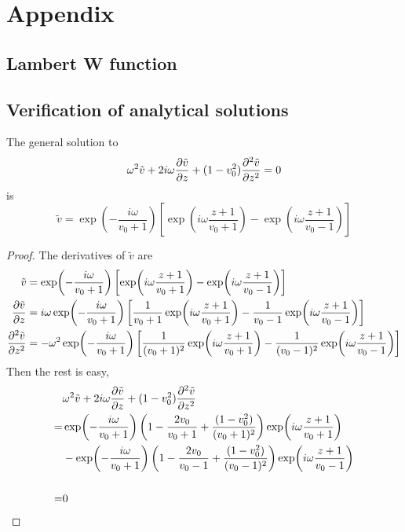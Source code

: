\chapter*{Appendix}
\section*{Lambert W function}


\section*{Verification of analytical solutions}
\begin{theorem}
    The general solution to 
    \[
        \omega^2\tilde{v} + 2i\omega\pdv{\tilde{v}}{z} + (1-v_0^2)\pdv[2]{\tilde{v}}{z} = 0
    \]
    is 
    \[ 
        \tilde{v} = \exp(-\frac{i\omega}{v_0+1})
        \left[ \exp(i\omega\frac{z+1}{v_0+1}) 
        - \exp(i\omega\frac{z+1}{v_0-1}) \right]
    \]
\end{theorem}
\begin{proof}
    The derivatives of $\tilde{v}$ are 
    \begin{align*}
        \tilde{v} &= \exp(-\frac{i\omega}{v_0+1})
        \left[ \exp(i\omega\frac{z+1}{v_0+1}) 
        - \exp(i\omega\frac{z+1}{v_0-1}) \right] \\
        \pdv{\tilde{v}}{z} &= i\omega\exp(-\frac{i\omega}{v_0+1})
        \left[ \frac{1}{v_0+1}\exp(i\omega\frac{z+1}{v_0+1}) - \frac{1}{v_0-1}\exp(i\omega\frac{z+1}{v_0-1}) \right] \\
        \pdv[2]{\tilde{v}}{z} &= -\omega^2\exp(-\frac{i\omega}{v_0+1})
        \left[ \frac{1}{(v_0+1)^2}\exp(i\omega\frac{z+1}{v_0+1}) - \frac{1}{(v_0-1)^2}\exp(i\omega\frac{z+1}{v_0-1}) \right]
    \end{align*}
    Then the rest is easy,
    \begin{align*}
        &\omega^2\tilde{v} + 2i\omega\pdv{\tilde{v}}{z} + (1-v_0^2)\pdv[2]{\tilde{v}}{z} \\
        =& \exp(-\frac{i\omega}{v_0+1})
            \left(1-\frac{2v_0}{v_0+1} + \frac{(1-v_0^2)}{(v_0+1)^2}\right)\exp(i\omega\frac{z+1}{v_0+1})
        \\
        &-\exp(-\frac{i\omega}{v_0+1})\left(1-\frac{2v_0}{v_0-1} + \frac{(1-v_0^2)}{(v_0-1)^2}\right)\exp(i\omega\frac{z+1}{v_0-1}) \\
        \\
        =& 0
    \end{align*}
\end{proof}

